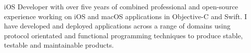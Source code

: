 %
iOS Developer with over five years of combined professional and open-source
experience working on iOS and macOS applications in Objective-C and Swift. I
have developed and deployed applications across a range of domains using
protocol orientated and functional programming techniques to produce stable,
testable and maintainable products.

\bigskip

